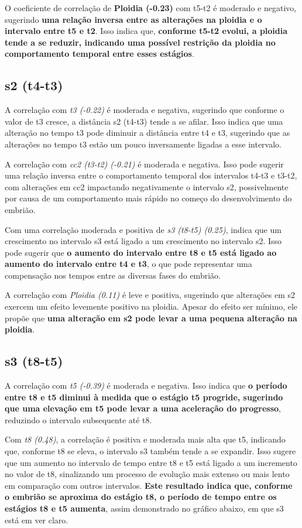 O coeficiente de correlação de \textbf{Ploidia (-0.23)} com t5-t2 é moderado e negativo, sugerindo \textbf{uma relação inversa entre as alterações na ploidia e o intervalo entre t5 e t2}. Isso indica que, \textbf{conforme t5-t2 evolui, a ploidia tende a se reduzir, indicando uma possível restrição da ploidia no comportamento temporal entre esses estágios}. 

\subsection*{s2 (t4-t3)}
A correlação com \textit{t3 (-0.22)} é moderada e negativa, sugerindo que conforme o valor de t3 cresce, a distância s2 (t4-t3) tende a se afilar. Isso indica que uma alteração no tempo t3 pode diminuir a distância entre t4 e t3, sugerindo que as alterações no tempo t3 estão um pouco inversamente ligadas a esse intervalo.

A correlação com \textit{cc2 (t3-t2) (-0.21)} é moderada e negativa. Isso pode sugerir uma relação inversa entre o comportamento temporal dos intervalos t4-t3 e t3-t2, com alterações em cc2 impactando negativamente o intervalo s2, possivelmente por causa de um comportamento mais rápido no começo do desenvolvimento do embrião.

Com uma correlação moderada e positiva de \textit{s3 (t8-t5) (0.25)}, indica que um crescimento no intervalo s3 está ligado a um crescimento no intervalo s2. Isso pode sugerir que \textbf{o aumento do intervalo entre t8 e t5 está ligado ao aumento do intervalo entre t4 e t3}, o que pode representar uma compensação nos tempos entre as diversas fases do embrião.

A correlação com \textit{Ploidia (0.11)} é leve e positiva, sugerindo que alterações em s2 exercem um efeito levemente positivo na ploidia. Apesar do efeito ser mínimo, ele propõe que \textbf{uma alteração em s2 pode levar a uma pequena alteração na ploidia}.

\subsection*{s3 (t8-t5)}
A correlação com \textit{t5 (-0.39)} é moderada e negativa. Isso indica que \textbf{o período entre t8 e t5 diminui à medida que o estágio t5 progride, sugerindo que uma elevação em t5 pode levar a uma aceleração do progresso}, reduzindo o intervalo subsequente até t8. 

Com \textit{t8 (0.48)}, a correlação é positiva e moderada mais alta que t5, indicando que, conforme t8 se eleva, o intervalo s3 também tende a se expandir. Isso sugere que um aumento no intervalo de tempo entre t8 e t5 está ligado a um incremento no valor de t8, sinalizando um processo de evolução mais extenso ou mais lento em comparação com outros intervalos. \textbf{Este resultado indica que, conforme o embrião se aproxima do estágio t8, o período de tempo entre os estágios t8 e t5 aumenta}, assim demonstrado no gráfico abaixo, em que s3 está em ver claro. 

